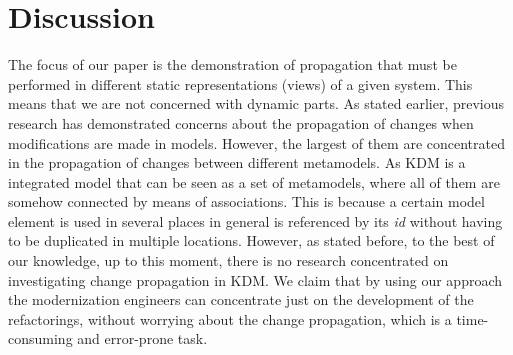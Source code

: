 
\section{Discussion}\label{sec:a_brief_discussion}

The focus of our paper is the demonstration of propagation that must be performed in different static representations (views) of a given system. This means that we are not concerned with dynamic parts.
As stated earlier, previous research has demonstrated concerns about the propagation of changes when modifications are made in models. However, the largest of them are concentrated in the propagation of changes between different metamodels. As KDM is a integrated model that can be seen as a set of metamodels, where all of them are somehow connected by means of associations. This is because a certain model element is used in several places in general is referenced by its \textit{id} without having to be duplicated in multiple locations. However, as stated before, to the best of our knowledge, up to this moment, there is no research concentrated on investigating change propagation in KDM. We claim that by using our approach the modernization engineers can concentrate just on the development of the refactorings, without worrying about the change propagation, which is a time-consuming and error-prone task.



